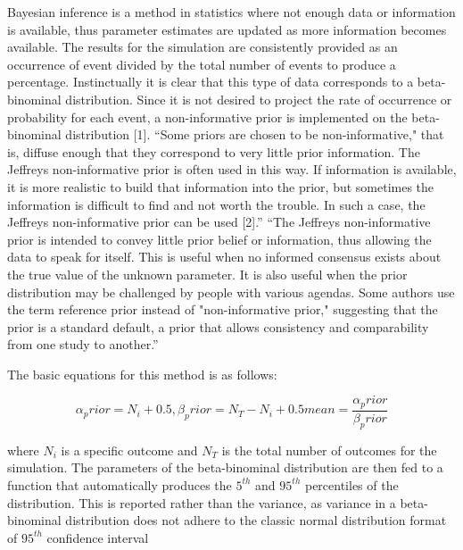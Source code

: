 Bayesian inference is a method in statistics where not enough data or information is 
available, thus parameter estimates are updated as more information becomes available. 
The results for the simulation are consistently provided as an occurrence of event 
divided by the total number of events to produce a percentage. Instinctually it is 
clear that this type of data corresponds to a beta-binominal distribution.  
Since it is not desired to project the rate of occurrence or probability for each event,
 a non-informative prior is implemented on the beta-binominal distribution [1].
``Some priors are chosen to be non-informative," that is, diffuse enough that they correspond 
to very little prior information. The Jeffreys non-informative prior is often used in this way. 
If information is available, it is more realistic to build that information into the prior, 
but sometimes the information is difficult to find and not worth the trouble. 
In such a case, the Jeffreys non-informative prior can be used [2].''
``The Jeffreys non-informative prior is intended to convey little prior belief or information, 
thus allowing the data to speak for itself. This is useful when no informed consensus exists 
about the true value of the unknown parameter. It is also useful when the prior distribution 
may be challenged by people with various agendas. Some authors use the term reference prior 
instead of "non-informative prior," suggesting that the prior is a standard default, a prior 
that allows consistency and comparability from one study to another.''

The basic equations for this method is as follows:

\begin{equation}
  \alpha_prior = N_i + 0.5  ,  \beta_prior = N_T - N_i + 0.5
  mean = \frac{\alpha_prior}{\beta_prior}
  \label{eq:priorDef}
\end{equation}

where $N_i$ is a specific outcome and $N_T$ is the total number of outcomes for the simulation. 
The parameters of the beta-binominal distribution are then fed to a function that automatically 
produces the $5^{th}$ and $95^{th}$ percentiles of the distribution.  This is reported rather than the 
variance, as variance in a beta-binominal distribution does not adhere to the classic normal 
distribution format of $95^{th}$ confidence interval

